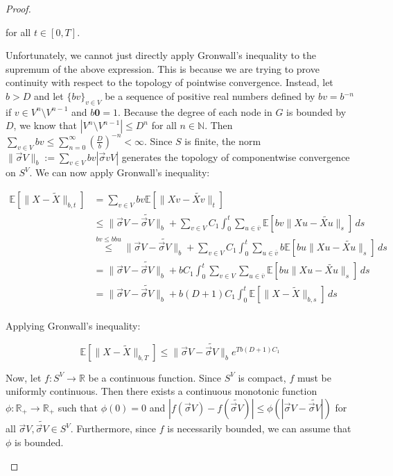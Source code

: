 \documentclass[12pt]{article}
\newcommand{\mb}{\mathbb}
\newcommand{\ra}{\rightarrow}
\newcommand{\ov}{\overline}
\newcommand{\os}{\overset}
\newcommand{\ind}{\hspace{24pt}}
\newcommand{\ex}[1]{\mb{E}\left[#1\right]}			%
\renewcommand{\root}{\mathbf{0}}				%
\renewcommand{\v}{v}							%
\newcommand{\vv}{u}								%
\renewcommand{\S}{S}							%
\newcommand{\s}{\sigma}							%
\newcommand{\sv}{\vec{\s}}						%
\renewcommand{\b}{b}							%
\newcommand{\T}{T}								%
\renewcommand{\t}{t}							%
\renewcommand{\tt}{s}							%
\newcommand{\X}{X}								%
\newcommand{\cl}{\ov}							%
\newcommand{\degr}{D}								%
\newcommand{\pup}[1]{^{#1}}							%
\renewcommand{\G}{G}								%
\newcommand{\V}{V}									%
\newcommand{\numb}{n}								%
\newcommand{\XState}[1]{\S^{#1}}				%
\newcommand{\const}[1]{C_{#1}}						%
\newcommand{\alt}{\widetilde}						%
\begin{document}
\begin{proof}
\begin{enumerate}[(a)]
for all \(\t \in [0,\T]\).

\ind Unfortunately, we cannot just directly apply Gronwall's inequality to the supremum of the above expression. This is because we are trying to prove continuity with respect to the topology of pointwise convergence. Instead, let \(\b{} > \degr\) and let \(\{\b{\v}\}_{\v \in \V}\) be a sequence of positive real numbers defined by \(\b{\v} = \b{}^{-\numb}\) if \(\v \in \V\pup{\numb}\setminus \V\pup{\numb-1}\) and \(\b{\root} = 1\). Because the degree of each node in \(\G\) is bounded by \(\degr\), we know that \(|\V\pup{\numb}\setminus \V\pup{\numb-1}| \leq \degr^{\numb}\) for all \(\numb\in \mb{N}\). Then \(\sum_{\v \in \V} \b{\v} \leq \sum_{\numb=0}^\infty \left(\frac{\degr}{\b{}}\right)^{-\numb} < \infty\). Since \(\S\) is finite, the norm \(\|\sv{}{\V}\|_{\b{}} := \sum_{\v \in \V} \b{\v}|\sv{\v}{\V}|\) generates the topology of componentwise convergence on \(\S^\V\). We can now apply Gronwall's inequality:

\begin{align*}
\ex{\|\X{}{} - \alt{\X{}{}}\|_{\b{},\t}} &= \sum_{\v \in \V} \b{\v}\ex{\|\X{\v}{} - \alt{\X{\v}{}}\|_\t}\\
&\leq \|\sv{}{\V} - \alt{\sv{}{\V}}\|_{\b{}} + \sum_{\v \in \V}\const{1}\int_0^\t \sum_{\vv \in \cl{\v}} \ex{\b{\v}\|\X{\vv}{} - \alt{\X{\vv}{}}\|_\tt}\,d\tt\\
&\os{\b{\v}\leq \b{}\b{\vv}}{\leq} \|\sv{}{\V} - \alt{\sv{}{\V}}\|_{\b{}} + \sum_{\v \in \V}\const{1}\int_0^\t \sum_{\vv \in \cl{\v}} \b{}\ex{\b{\vv}\|\X{\vv}{} - \alt{\X{\vv}{}}\|_\tt}\,d\tt\\
&= \|\sv{}{\V} - \alt{\sv{}{\V}}\|_{\b{}} + \b{}\const{1}\int_0^\t \sum_{\v \in \V}\sum_{\vv \in \cl{\v}} \ex{\b{\vv}\|\X{\vv}{} - \alt{\X{\vv}{}}\|_\tt}\,d\tt\\
&=\|\sv{}{\V} - \alt{\sv{}{\V}}\|_{\b{}} + \b{}(\degr+1)\const{1}\int_0^\t \ex{\|\X{}{} - \alt{\X{}{}}\|_{\b{},\tt}}\,d\tt\\
\end{align*}

Applying Gronwall's inequality:

\[\ex{\|\X{}{} - \alt{\X{}{}}\|_{\b{},\T}} \leq \|\sv{}{\V} - \alt{\sv{}{\V}}\|_{\b{}}e^{\T\b{}(\degr+1)\const{1}}\]

Now, let \(f: \S^\V \ra \mb{R}\) be a continuous function. Since \(\S^\V\) is compact, \(f\) must be uniformly continuous. Then there exists a continuous monotonic function \(\phi: \mb{R}_+ \ra \mb{R}_+\) such that \(\phi(0) = 0\) and \(|f(\sv{}{\V}) - f(\alt{\sv{}{\V}})| \leq \phi(|\sv{}{\V} - \alt{\sv{}{\V}}|)\) for all \(\sv{}{\V},\alt{\sv{}{\V}}\in \S^\V\). Furthermore, since \(f\) is necessarily bounded, we can assume that \(\phi\) is bounded.


\end{enumerate}
\end{proof}
\end{document}
